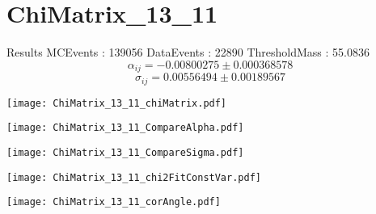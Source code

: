 \documentclass[a4paper,12pt]{article}
\begin{document}
\section{ChiMatrix\_13\_11}
\begin{minipage}{0.49\linewidth} Results \newline
MCEvents : 139056\newline
DataEvents : 22890 \newline
ThresholdMass : 55.0836\\
$$\alpha_{ij} = -0.00800275\pm 0.000368578$$
$$\sigma_{ij} = 0.00556494\pm 0.00189567$$
\end{minipage}\hfill
\begin{minipage}{0.49\linewidth} 
\texttt{[image: ChiMatrix\_13\_11\_chiMatrix.pdf]}\\
\end{minipage}
\hfill
\begin{minipage}{0.49\linewidth} 
\texttt{[image: ChiMatrix\_13\_11\_CompareAlpha.pdf]}\\
\end{minipage}
\hfill
\begin{minipage}{0.49\linewidth} 
\texttt{[image: ChiMatrix\_13\_11\_CompareSigma.pdf]}\\
\end{minipage}
\begin{minipage}{0.49\linewidth} 
\texttt{[image: ChiMatrix\_13\_11\_chi2FitConstVar.pdf]}\\
\end{minipage}
\hfill
\begin{minipage}{0.49\linewidth} 
\texttt{[image: ChiMatrix\_13\_11\_corAngle.pdf]}\\
\end{minipage}
\end{document}
